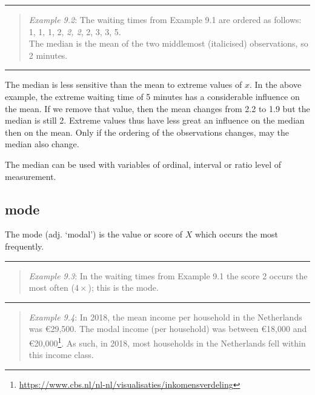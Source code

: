 \documentclass[
]{book}
\begin{document}
\begin{center}\rule{0.5\linewidth}{0.5pt}\end{center}

\begin{quote}
\emph{Example 9.2}: The waiting times from Example 9.1
are ordered as follows:\\
1, 1, 1, 2, \emph{2, 2}, 2, 3, 3, 5.\\
The median is the mean of the two middlemost (italicised)
observations, so 2 minutes.
\end{quote}

\begin{center}\rule{0.5\linewidth}{0.5pt}\end{center}

The median is less sensitive than the mean to extreme values
of \(x\). In the above example, the extreme waiting time of 5 minutes
has a considerable influence on the mean. If we remove
that value, then the mean changes from 2.2 to 1.9 but the median is still
2. Extreme values thus have less great an influence on the
median then on the mean. Only if
the ordering of the observations changes, may the median also
change.

The median can be used with variables of ordinal, interval or ratio
level of measurement.

\hypertarget{mode}{%
\subsection{mode}\label{mode}}

The mode (adj. `modal') is the value or score of \(X\) which occurs
the most frequently.

\begin{center}\rule{0.5\linewidth}{0.5pt}\end{center}

\begin{quote}
\emph{Example 9.3}: In the waiting times from Example 9.1
the score 2 occurs the most often (\(4\times\)); this is the mode.
\end{quote}

\begin{center}\rule{0.5\linewidth}{0.5pt}\end{center}

\begin{quote}
\emph{Example 9.4}: In 2018, the mean income per household in the Netherlands was €29,500.
The modal income (per household) was between €18,000 and €20,000\footnote{\url{https://www.cbs.nl/nl-nl/visualisaties/inkomensverdeling}}. As such, in
2018, most households in the Netherlands fell within this income class.
\end{quote}
\end{document}
